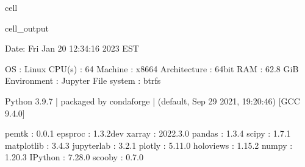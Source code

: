 \documentclass[letterpaper,table,10pt,english]{jupyterBook}
\begin{document}
\begin{sphinxuseclass}{cell}
\begin{sphinxVerbatimOutput}
\begin{sphinxuseclass}{cell_output}
\begin{sphinxVerbatim}[commandchars=\\\{\}]
\PYGZhy{}\PYGZhy{}\PYGZhy{}\PYGZhy{}\PYGZhy{}\PYGZhy{}\PYGZhy{}\PYGZhy{}\PYGZhy{}\PYGZhy{}\PYGZhy{}\PYGZhy{}\PYGZhy{}\PYGZhy{}\PYGZhy{}\PYGZhy{}\PYGZhy{}\PYGZhy{}\PYGZhy{}\PYGZhy{}\PYGZhy{}\PYGZhy{}\PYGZhy{}\PYGZhy{}\PYGZhy{}\PYGZhy{}\PYGZhy{}\PYGZhy{}\PYGZhy{}\PYGZhy{}\PYGZhy{}\PYGZhy{}\PYGZhy{}\PYGZhy{}\PYGZhy{}\PYGZhy{}\PYGZhy{}\PYGZhy{}\PYGZhy{}\PYGZhy{}\PYGZhy{}\PYGZhy{}\PYGZhy{}\PYGZhy{}\PYGZhy{}\PYGZhy{}\PYGZhy{}\PYGZhy{}\PYGZhy{}\PYGZhy{}\PYGZhy{}\PYGZhy{}\PYGZhy{}\PYGZhy{}\PYGZhy{}\PYGZhy{}\PYGZhy{}\PYGZhy{}\PYGZhy{}\PYGZhy{}\PYGZhy{}\PYGZhy{}\PYGZhy{}\PYGZhy{}\PYGZhy{}\PYGZhy{}\PYGZhy{}\PYGZhy{}\PYGZhy{}\PYGZhy{}\PYGZhy{}\PYGZhy{}\PYGZhy{}\PYGZhy{}\PYGZhy{}\PYGZhy{}\PYGZhy{}\PYGZhy{}\PYGZhy{}\PYGZhy{}
  Date: Fri Jan 20 12:34:16 2023 EST

                OS : Linux
            CPU(s) : 64
           Machine : x86\PYGZus{}64
      Architecture : 64bit
               RAM : 62.8 GiB
       Environment : Jupyter
       File system : btrfs

  Python 3.9.7 | packaged by conda\PYGZhy{}forge | (default, Sep 29 2021, 19:20:46)
  [GCC 9.4.0]

             pemtk : 0.0.1
           epsproc : 1.3.2\PYGZhy{}dev
            xarray : 2022.3.0
            pandas : 1.3.4
             scipy : 1.7.1
        matplotlib : 3.4.3
        jupyterlab : 3.2.1
            plotly : 5.11.0
         holoviews : 1.15.2
             numpy : 1.20.3
           IPython : 7.28.0
            scooby : 0.7.0
\PYGZhy{}\PYGZhy{}\PYGZhy{}\PYGZhy{}\PYGZhy{}\PYGZhy{}\PYGZhy{}\PYGZhy{}\PYGZhy{}\PYGZhy{}\PYGZhy{}\PYGZhy{}\PYGZhy{}\PYGZhy{}\PYGZhy{}\PYGZhy{}\PYGZhy{}\PYGZhy{}\PYGZhy{}\PYGZhy{}\PYGZhy{}\PYGZhy{}\PYGZhy{}\PYGZhy{}\PYGZhy{}\PYGZhy{}\PYGZhy{}\PYGZhy{}\PYGZhy{}\PYGZhy{}\PYGZhy{}\PYGZhy{}\PYGZhy{}\PYGZhy{}\PYGZhy{}\PYGZhy{}\PYGZhy{}\PYGZhy{}\PYGZhy{}\PYGZhy{}\PYGZhy{}\PYGZhy{}\PYGZhy{}\PYGZhy{}\PYGZhy{}\PYGZhy{}\PYGZhy{}\PYGZhy{}\PYGZhy{}\PYGZhy{}\PYGZhy{}\PYGZhy{}\PYGZhy{}\PYGZhy{}\PYGZhy{}\PYGZhy{}\PYGZhy{}\PYGZhy{}\PYGZhy{}\PYGZhy{}\PYGZhy{}\PYGZhy{}\PYGZhy{}\PYGZhy{}\PYGZhy{}\PYGZhy{}\PYGZhy{}\PYGZhy{}\PYGZhy{}\PYGZhy{}\PYGZhy{}\PYGZhy{}\PYGZhy{}\PYGZhy{}\PYGZhy{}\PYGZhy{}\PYGZhy{}\PYGZhy{}\PYGZhy{}\PYGZhy{}
\end{sphinxVerbatim}

\end{sphinxuseclass}\end{sphinxVerbatimOutput}

\end{sphinxuseclass}
\end{document}
